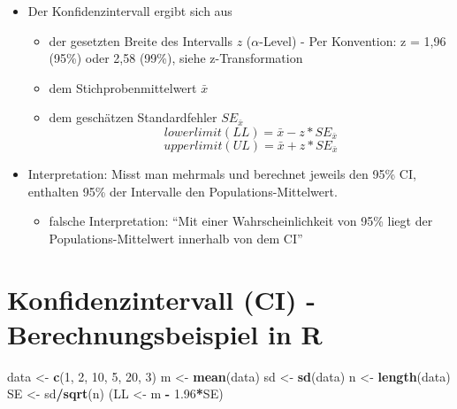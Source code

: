 \documentclass[
]{book}
\newenvironment{Shaded}{\begin{snugshade}}{\end{snugshade}}
\newcommand{\DecValTok}[1]{\textcolor[rgb]{0.00,0.00,0.81}{#1}}
\newcommand{\FloatTok}[1]{\textcolor[rgb]{0.00,0.00,0.81}{#1}}
\newcommand{\KeywordTok}[1]{\textcolor[rgb]{0.13,0.29,0.53}{\textbf{#1}}}
\newcommand{\NormalTok}[1]{#1}
\newcommand{\OperatorTok}[1]{\textcolor[rgb]{0.81,0.36,0.00}{\textbf{#1}}}
\newcommand{\StringTok}[1]{\textcolor[rgb]{0.31,0.60,0.02}{#1}}
\providecommand{\tightlist}{%
  \setlength{\itemsep}{0pt}\setlength{\parskip}{0pt}}
\begin{document}
\begin{itemize}
\tightlist
\item
  Der Konfidenzintervall ergibt sich aus

  \begin{itemize}
  \tightlist
  \item
    der gesetzten Breite des Intervalls \(z\) (\(\alpha\)-Level)
    - Per Konvention: z = 1,96 (95\%) oder 2,58 (99\%), siehe z-Transformation
  \item
    dem Stichprobenmittelwert \(\bar{x}\)
  \item
    dem geschätzen Standardfehler \(SE_{\bar{x}}\)
    \[ lower limit (LL) = \bar{x} - z * SE_{\bar{x}} \]
    \[ upper limit (UL) = \bar{x} + z * SE_{\bar{x}} \]
  \end{itemize}
\item
  Interpretation: Misst man mehrmals und berechnet jeweils den 95\% CI, enthalten 95\% der Intervalle den Populations-Mittelwert.

  \begin{itemize}
  \tightlist
  \item
    falsche Interpretation: ``Mit einer Wahrscheinlichkeit von 95\% liegt der Populations-Mittelwert innerhalb von dem CI''
  \end{itemize}
\end{itemize}

\hypertarget{konfidenzintervall-ci---berechnungsbeispiel-in-r}{%
\section{Konfidenzintervall (CI) - Berechnungsbeispiel in R}\label{konfidenzintervall-ci---berechnungsbeispiel-in-r}}

\begin{Shaded}
\begin{Highlighting}[]
\NormalTok{data <-}\StringTok{ }\KeywordTok{c}\NormalTok{(}\DecValTok{1}\NormalTok{, }\DecValTok{2}\NormalTok{, }\DecValTok{10}\NormalTok{, }\DecValTok{5}\NormalTok{, }\DecValTok{20}\NormalTok{, }\DecValTok{3}\NormalTok{)}
\NormalTok{m <-}\StringTok{ }\KeywordTok{mean}\NormalTok{(data)}
\NormalTok{sd <-}\StringTok{ }\KeywordTok{sd}\NormalTok{(data)}
\NormalTok{n <-}\StringTok{ }\KeywordTok{length}\NormalTok{(data)}
\NormalTok{SE <-}\StringTok{ }\NormalTok{sd}\OperatorTok{/}\KeywordTok{sqrt}\NormalTok{(n)}
\NormalTok{(LL <-}\StringTok{ }\NormalTok{m }\OperatorTok{-}\StringTok{ }\FloatTok{1.96}\OperatorTok{*}\NormalTok{SE)}
\end{Highlighting}
\end{Shaded}
\end{document}
